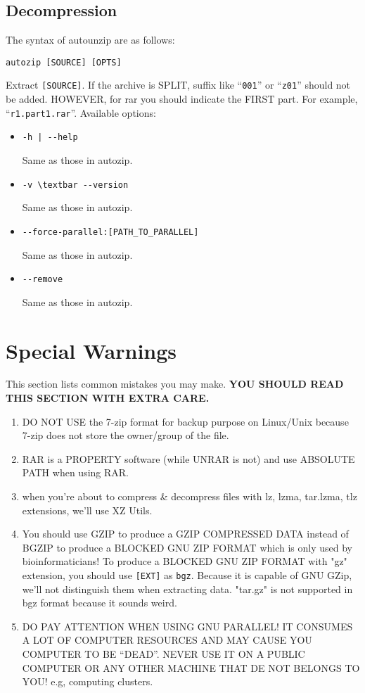 \documentclass[fleqn,10pt]{SelfArx} %
\begin{document}
\subsection{Decompression}
The syntax of autounzip are as follows:
\begin{verbatim}
autozip [SOURCE] [OPTS]
\end{verbatim}
Extract \verb|[SOURCE]|. If the archive is SPLIT, suffix like ``\verb|001|'' or ``\verb|z01|'' should not be added. HOWEVER, for rar you should indicate the FIRST part. For example, ``\verb|r1.part1.rar|''. Available options:
\begin{itemize}
\item \verb+-h | --help+ \par Same as those in autozip.
\item \verb+-v \textbar --version+ \par Same as those in autozip.
\item \verb+--force-parallel:[PATH_TO_PARALLEL]+ \par Same as those in autozip.
\item \verb+--remove+ \par Same as those in autozip.
\end{itemize}
\section{Special Warnings}
This section lists common mistakes you may make. \textbf{YOU SHOULD READ THIS SECTION WITH EXTRA CARE.} \par
\begin{enumerate}
\item DO NOT USE the 7-zip format for backup purpose on Linux/Unix because 7-zip does not store the owner/group of the file.
\item RAR is a PROPERTY software (while UNRAR is not) and use ABSOLUTE PATH when using RAR.
\item when you're about to compress \& decompress files with lz, lzma, tar.lzma, tlz extensions, we'll use XZ Utils.
\item You should use GZIP to produce a GZIP COMPRESSED DATA instead of BGZIP to produce a BLOCKED GNU ZIP FORMAT which is only used by bioinformaticians! To produce a BLOCKED GNU ZIP FORMAT with "gz" extension, you should use \verb|[EXT]| as \verb|bgz|. Because it is capable of GNU GZip, we'll not distinguish them when extracting data. "tar.gz" is not supported in bgz format because it sounds weird.
\item DO PAY ATTENTION WHEN USING GNU PARALLEL! IT CONSUMES A LOT OF COMPUTER RESOURCES AND MAY CAUSE YOU COMPUTER TO BE ``DEAD''. NEVER USE IT ON A PUBLIC COMPUTER OR ANY OTHER MACHINE THAT DE NOT BELONGS TO YOU! e.g, computing clusters.
\end{enumerate}
\end{document}
